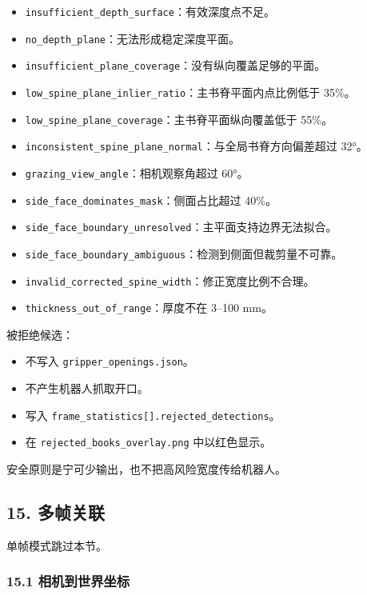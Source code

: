 \documentclass[
  chinese,
  11pt,
  a4paper,
]{article}
\providecommand{\tightlist}{%
  \setlength{\itemsep}{0pt}\setlength{\parskip}{0pt}}
\begin{document}
\begin{itemize}
\tightlist
\item
  \texttt{insufficient\_depth\_surface}：有效深度点不足。
\item
  \texttt{no\_depth\_plane}：无法形成稳定深度平面。
\item
  \texttt{insufficient\_plane\_coverage}：没有纵向覆盖足够的平面。
\item
  \texttt{low\_spine\_plane\_inlier\_ratio}：主书脊平面内点比例低于
  35\%。
\item
  \texttt{low\_spine\_plane\_coverage}：主书脊平面纵向覆盖低于 55\%。
\item
  \texttt{inconsistent\_spine\_plane\_normal}：与全局书脊方向偏差超过
  32°。
\item
  \texttt{grazing\_view\_angle}：相机观察角超过 60°。
\item
  \texttt{side\_face\_dominates\_mask}：侧面占比超过 40\%。
\item
  \texttt{side\_face\_boundary\_unresolved}：主平面支持边界无法拟合。
\item
  \texttt{side\_face\_boundary\_ambiguous}：检测到侧面但裁剪量不可靠。
\item
  \texttt{invalid\_corrected\_spine\_width}：修正宽度比例不合理。
\item
  \texttt{thickness\_out\_of\_range}：厚度不在 3--100 mm。
\end{itemize}

被拒绝候选：

\begin{itemize}
\tightlist
\item
  不写入 \texttt{gripper\_openings.json}。
\item
  不产生机器人抓取开口。
\item
  写入 \texttt{frame\_statistics{[}{]}.rejected\_detections}。
\item
  在 \texttt{rejected\_books\_overlay.png} 中以红色显示。
\end{itemize}

安全原则是宁可少输出，也不把高风险宽度传给机器人。

\subsection{15. 多帧关联}\label{15-ux591aux5e27ux5173ux8054}

单帧模式跳过本节。

\subsubsection{15.1
相机到世界坐标}\label{151-ux76f8ux673aux5230ux4e16ux754cux5750ux6807}
\end{document}
